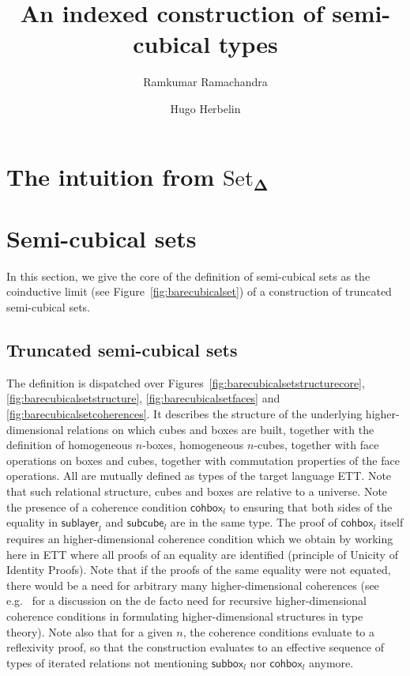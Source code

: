\documentclass[a4paper]{article}
\title{An indexed construction of semi-cubical types}
\author{Ramkumar Ramachandra}
\author{Hugo Herbelin}
\newcommand{\homoname}{}
\newcommand{\downbox}[2]{\mathsf{sub{\homoname}box}_{#1}^{#2}}
\newcommand{\downlayer}[2]{\mathsf{sub{\homoname}layer}_{#1}^{#2}}
\newcommand{\downcube}[2]{\mathsf{sub{\homoname}cube}_{#1}^{#2}}
\newcommand{\cohbox}[2]{\mathsf{coh{\homoname}box}_{{#1}}^{{#2}}}
\newcommand{\SSet}{\ensuremath{\text{Set}_{\boldsymbol{\Delta}}}}
\begin{document}
\maketitle

\tableofcontents

\section{The intuition from \SSet}

\section{Semi-cubical sets}
\label{sec:truncated-cubical-sets}

In this section, we give the core of the definition of semi-cubical
sets as the coinductive limit (see Figure~\ref{fig:barecubicalset}) of a
construction of truncated semi-cubical sets.

\subsection{Truncated semi-cubical sets}

The definition is dispatched over Figures~\ref{fig:barecubicalsetstructurecore}, \ref{fig:barecubicalsetstructure}, \ref{fig:barecubicalsetfaces} and \ref{fig:barecubicalsetcoherences}. It describes the structure of the underlying higher-dimensional relations on which cubes and boxes are built, together with the definition of homogeneous $n$-boxes, homogeneous $n$-cubes, together with face operations on boxes and cubes, together with commutation properties of the face operations. All are mutually defined as types of the target language ETT. Note that such relational structure, cubes and boxes are relative to a universe. Note the presence of a coherence condition $\cohbox{l}{}$ to ensuring that both sides of the equality in $\downlayer{l}{}$ and $\downcube{l}{}$ are in the same type. The proof of $\cohbox{l}{}$ itself requires an higher-dimensional coherence condition which we obtain by working here in ETT where all proofs of an equality are identified (principle of Unicity of Identity Proofs). Note that if the proofs of the same equality were not equated, there would be a need for arbitrary many higher-dimensional coherences (see e.g.~\cite{Herbelin15} for a discussion on the de facto need for recursive higher-dimensional coherence conditions in formulating higher-dimensional structures in type theory). Note also that for a given $n$, the coherence conditions evaluate to a reflexivity proof, so that the construction evaluates to an effective sequence of types of iterated relations not mentioning $\downbox{l}{}$ nor $\cohbox{l}{}$ anymore.
\end{document}
